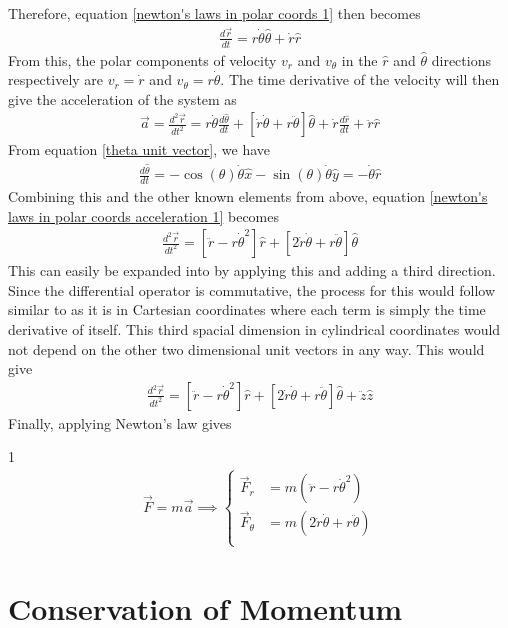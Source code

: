Therefore, equation \ref{newton's laws in polar coords 1} then becomes
\begin{align}
\frac{d \vec{r}}{dt} = r\dot{\theta} \hat{\theta} + \dot{r} \hat{r} \label{newton's laws in polar coords 2}
\end{align}
From this, the polar components of velocity $v_r$ and $v_\theta$ in the $\hat{r}$ and $\hat{\theta}$ directions respectively are $v_r = \dot{r}$ and $v_\theta = r\dot{\theta}$. The time derivative of the velocity will then give the acceleration of the system as
\begin{align}
\vec{a} = \frac{d^2 \vec{r}}{dt^2} = r\dot{\theta} \frac{d\hat{\theta}}{dt} + \left[\dot{r}\dot{\theta} + r\ddot{\theta}\right] \hat{\theta}      + \dot{r} \frac{d\hat{r}}{dt}  + \ddot{r} \hat{r} \label{newton's laws in polar coords acceleration 1}
\end{align}
From equation \ref{theta unit vector}, we have
\begin{align}
\frac{d\hat{\theta}}{dt} = -\cos(\theta)\dot{\theta}\hat{x} - \sin(\theta)\dot{\theta}\hat{y} = -\dot{\theta}\hat{r}
\end{align}
Combining this and the other known elements from above, equation \ref{newton's laws in polar coords acceleration 1} becomes
\begin{align}
\frac{d^2 \vec{r}}{dt^2} = \left[\ddot{r}-r\dot{\theta}^2\right]\hat{r} + \left[2\dot{r}\dot{\theta} + r\ddot{\theta}\right] \hat{\theta} \label{newton's laws in polar coords acceleration 2}
\end{align}
This can easily be expanded into  by applying this and adding a third direction. Since the differential operator is commutative, the process for this would follow similar to as it is in Cartesian coordinates where each term is simply the time derivative of itself. This third spacial dimension in cylindrical coordinates would not depend on the other two dimensional unit vectors in any way. This would give 
\begin{align}
\frac{d^2 \vec{r}}{dt^2} = \left[\ddot{r}-r\dot{\theta}^2\right]\hat{r} + \left[2\dot{r}\dot{\theta} + r\ddot{\theta}\right] \hat{\theta} + \ddot{z}\hat{z} \label{newton's laws in polar coords acceleration 3}
\end{align}
Finally, applying Newton's law gives 
\begin{defn}{1}
\begin{align}
\vec{F} = m\vec{a}  \implies \left\{
\begin{array}{ll}
      \vec{F}_r &= m(\ddot{r}-r\dot{\theta}^2) \\
      \vec{F}_\theta &= m(2\dot{r}\dot{\theta} + r\ddot{\theta}) \\
\end{array} \right. 
\end{align}
\end{defn}













\section{Conservation of Momentum}




